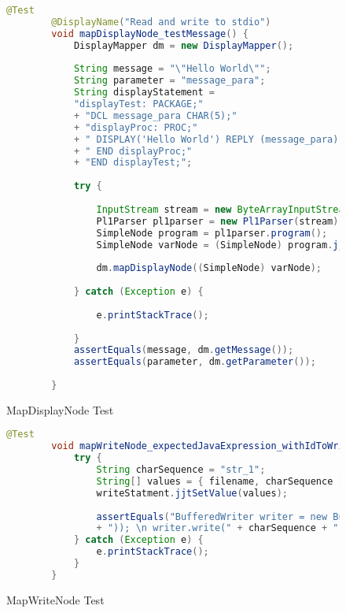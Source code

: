 \begin{figure}[H]\caption{MapDisplayNode Test} \label{lst:displayreply_test}
	\begin{lstlisting}[language=Java]
		@Test
		@DisplayName("Read and write to stdio")
		void mapDisplayNode_testMessage() {
			DisplayMapper dm = new DisplayMapper();
			
			String message = "\"Hello World\"";
			String parameter = "message_para";
			String displayStatement = 
			"displayTest: PACKAGE;"
			+ "DCL message_para CHAR(5);"
			+ "displayProc: PROC;"
			+ " DISPLAY('Hello World') REPLY (message_para);"
			+ " END displayProc;"
			+ "END displayTest;";
			
			try {
				
				InputStream stream = new ByteArrayInputStream(displayStatement.getBytes(StandardCharsets.UTF_8));
				Pl1Parser pl1parser = new Pl1Parser(stream);
				SimpleNode program = pl1parser.program();
				SimpleNode varNode = (SimpleNode) program.jjtGetChild(0).jjtGetChild(2).jjtGetChild(1).jjtGetChild(0);
				
				dm.mapDisplayNode((SimpleNode) varNode);
				
			} catch (Exception e) {
				
				e.printStackTrace();
				
			}
			assertEquals(message, dm.getMessage());
			assertEquals(parameter, dm.getParameter());
			
		}
	\end{lstlisting}
\end{figure}

\begin{figure}[H]\caption{MapWriteNode Test} \label{lst:javawriter_test}
	\begin{lstlisting}[language=Java]
		@Test
		void mapWriteNode_expectedJavaExpression_withIdToWriteTo() {
			try {
				String charSequence = "str_1";
				String[] values = { filename, charSequence };
				writeStatment.jjtSetValue(values);
				
				assertEquals("BufferedWriter writer = new BufferedWriter(new FileWriter(" + filename
				+ ")); \n writer.write(" + charSequence + ");", writeMapper.translate(writeStatment));
			} catch (Exception e) {
				e.printStackTrace();
			}
		}
	\end{lstlisting}
\end{figure}


